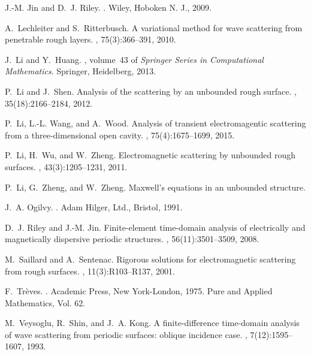 \documentclass[11pt,reqno]{amsart}
\numberwithin{equation}{section}
\begin{document}
\begin{thebibliography}{10}
J.-M. Jin and D.~J. Riley.
.
\newblock Wiley, Hoboken N. J., 2009.

A.~Lechleiter and S.~Ritterbusch.
\newblock A variational method for wave scattering from penetrable rough
  layers.
, 75(3):366--391, 2010.

J.~Li and Y.~Huang.
, volume~43 of {\em Springer Series in Computational
  Mathematics}.
\newblock Springer, Heidelberg, 2013.

P.~Li and J.~Shen.
\newblock Analysis of the scattering by an unbounded rough surface.
, 35(18):2166--2184, 2012.

P.~Li, L.-L. Wang, and A.~Wood.
\newblock Analysis of transient electromagentic scattering from a
  three-dimensional open cavity.
, 75(4):1675--1699, 2015.

P.~Li, H.~Wu, and W.~Zheng.
\newblock Electromagnetic scattering by unbounded rough surfaces.
, 43(3):1205--1231, 2011.

P.~Li, G.~Zheng, and W.~Zheng.
\newblock Maxwell's equations in an unbounded structure.

J.~A. Ogilvy.
.
\newblock Adam Hilger, Ltd., Bristol, 1991.

D.~J. Riley and J.-M. Jin.
\newblock Finite-element time-domain analysis of electrically and magnetically
  dispersive periodic structures.
, 56(11):3501--3509, 2008.

M.~Saillard and A.~Sentenac.
\newblock Rigorous solutions for electromagnetic scattering from rough
  surfaces.
, 11(3):R103--R137, 2001.

F.~Tr{\`e}ves.
.
\newblock Academic Press, New York-London, 1975.
\newblock Pure and Applied Mathematics, Vol. 62.

M.~Veysoglu, R.~Shin, and J.~A. Kong.
\newblock A finite-difference time-domain analysis of wave scattering from
  periodic surfaces: oblique incidence case.
, 7(12):1595--1607, 1993.


\end{thebibliography}
\end{document}

